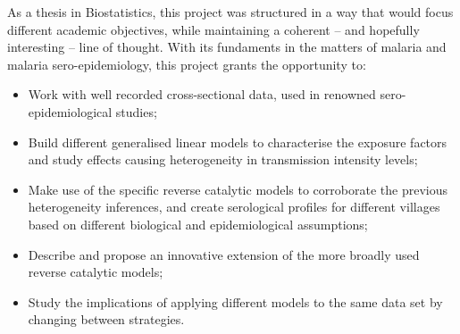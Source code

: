 As a thesis in Biostatistics, this project was structured in a way that would focus different academic objectives, while maintaining a coherent -- and hopefully interesting -- line of thought.
With its fundaments in the matters of malaria and malaria sero-epidemiology, this project grants the opportunity to:
\begin{itemize}
\item Work with well recorded cross-sectional data, used in renowned sero-epidemiological studies;
\item Build different generalised linear models to characterise the exposure factors and study effects causing heterogeneity in transmission intensity levels;
\item Make use of the specific reverse catalytic models to corroborate the previous heterogeneity inferences, and create serological profiles for different villages based on different biological and epidemiological assumptions;
\item Describe and propose an innovative extension of the more broadly used reverse catalytic models;
\item Study the implications of applying different models to the same data set by changing between strategies.
\end{itemize}

